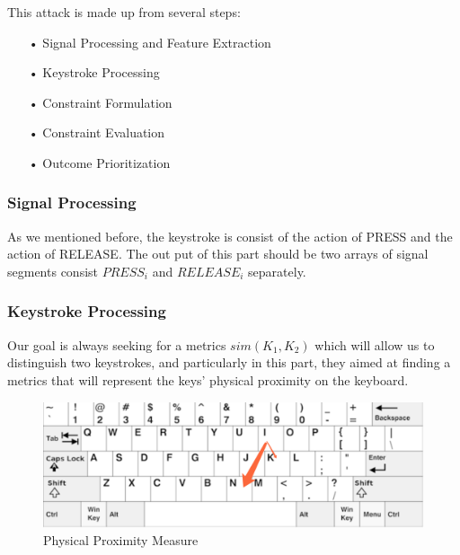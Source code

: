 \documentclass[12pt,a4paper]{article}
\begin{document}
This attack is made up from several steps: \\
\begin{itemize}
\item[•] Signal Processing and Feature Extraction
\item[•] Keystroke Processing
\item[•] Constraint Formulation 
\item[•] Constraint Evaluation
\item[•] Outcome Prioritization
\end{itemize}

\subsubsection{Signal Processing}

As we mentioned before, the keystroke is consist of the action of PRESS and the action of RELEASE. The out put of this part should be two arrays of signal segments consist $PRESS_{i}$ and $RELEASE_{i}$ separately.\\

\subsubsection{Keystroke Processing}

Our goal is always seeking for a metrics $sim(K_{1},K_{2})$ which will allow us to distinguish two keystrokes, and particularly in this part, they aimed at finding a metrics that will represent the keys' physical proximity on the keyboard. \\

\begin{figure}[h]
\begin{center}
        \includegraphics[scale=0.45]{keyboardQwer.png}
        \caption{Physical Proximity Measure}
        \label{fig:5}
\end{center}
\end{figure} \par
\FloatBarrier
\end{document}

